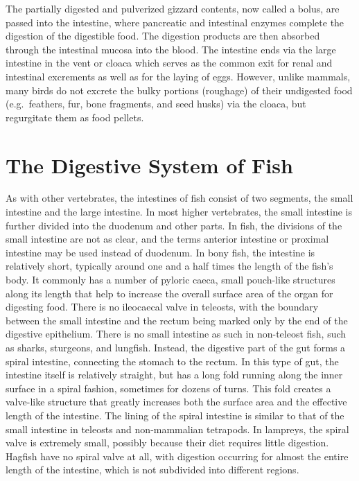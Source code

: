 The partially digested and pulverized gizzard contents, now called a bolus, are passed into the intestine, where pancreatic and intestinal enzymes complete the digestion of the digestible food. The digestion products are then absorbed through the intestinal mucosa into the blood. The intestine ends via the large intestine in the vent or cloaca which serves as the common exit for renal and intestinal excrements as well as for the laying of eggs. However, unlike mammals, many birds do not excrete the bulky portions (roughage) of their undigested food (e.g.~feathers, fur, bone fragments, and seed husks) via the cloaca, but regurgitate them as food pellets.

\hypertarget{the-digestive-system-of-fish}{%
\section{The Digestive System of Fish}\label{the-digestive-system-of-fish}}

As with other vertebrates, the intestines of fish consist of two segments, the small intestine and the large intestine. In most higher vertebrates, the small intestine is further divided into the duodenum and other parts. In fish, the divisions of the small intestine are not as clear, and the terms anterior intestine or proximal intestine may be used instead of duodenum. In bony fish, the intestine is relatively short, typically around one and a half times the length of the fish's body. It commonly has a number of pyloric caeca, small pouch-like structures along its length that help to increase the overall surface area of the organ for digesting food. There is no ileocaecal valve in teleosts, with the boundary between the small intestine and the rectum being marked only by the end of the digestive epithelium. There is no small intestine as such in non-teleost fish, such as sharks, sturgeons, and lungfish. Instead, the digestive part of the gut forms a spiral intestine, connecting the stomach to the rectum. In this type of gut, the intestine itself is relatively straight, but has a long fold running along the inner surface in a spiral fashion, sometimes for dozens of turns. This fold creates a valve-like structure that greatly increases both the surface area and the effective length of the intestine. The lining of the spiral intestine is similar to that of the small intestine in teleosts and non-mammalian tetrapods. In lampreys, the spiral valve is extremely small, possibly because their diet requires little digestion. Hagfish have no spiral valve at all, with digestion occurring for almost the entire length of the intestine, which is not subdivided into different regions.

